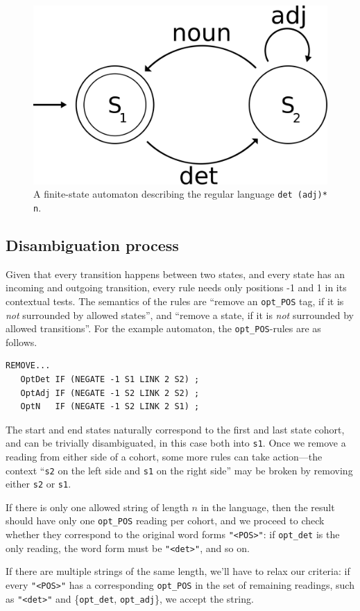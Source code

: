 \documentclass[11pt]{article}
\def\t#1{\texttt{#1}}
\def\maxAmbFSA#1{$\langle \Sigma,S \rangle_#1$}
\begin{document}
\begin{figure}[t]
  \centering
    \includegraphics[width=0.6\linewidth]{fsa.png}
  \caption{A finite-state automaton describing the regular language \t{det (adj)* n}.}
 \label{fig:fsa}
\end{figure}


\subsection{Disambiguation process}

Given that every transition happens between two states, and every state 
has an incoming and outgoing transition, every rule needs only
positions -1 and 1 in its contextual tests. 
The semantics of the rules are ``remove an \t{opt\_POS} tag, if it is 
\emph{not} surrounded by allowed states'',
and ``remove a state, if it is \emph{not} surrounded by allowed transitions''.
For the example automaton, the \t{opt\_POS}-rules are as follows.

\begin{verbatim}
REMOVE...
   OptDet IF (NEGATE -1 S1 LINK 2 S2) ;
   OptAdj IF (NEGATE -1 S2 LINK 2 S2) ;
   OptN   IF (NEGATE -1 S2 LINK 2 S1) ;
\end{verbatim}

The start and end states naturally correspond to the first and last state cohort, 
and can be trivially disambiguated, in this case both into \t{s1}.
Once we remove a reading from either side of a cohort, some more rules 
can take action---the context ``\t{s2} on the left side and \t{s1} on the right side''
may be broken by removing either \t{s2} or \t{s1}.

If there is only one allowed string of length $n$ in the language, 
then the result should have only one \t{opt\_POS} reading per cohort,
and we proceed to check whether they correspond to the original word forms \t{"<POS>"}: 
if \t{opt\_det} is the only reading, the word form must be \t{"<det>"}, and so on.

If there are multiple strings of the same length, we'll have to relax our criteria:
if every \t{"<POS>"} has a corresponding \t{opt\_POS} in the set of remaining readings, 
such as \t{"<det>"} and \{\t{opt\_det}, \t{opt\_adj}\}, we accept the string.
\end{document}
